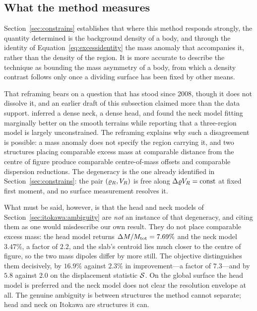 \subsection{What the method measures}
\label{sec:discussion:measures}

Section~\ref{sec:constrains} establishes that where this method responds
strongly, the quantity determined is the background density of a body, and
through the identity of Equation~\eqref{eq:excessidentity} the mass anomaly
that accompanies it, rather than the density of the region. It is more
accurate to describe the technique as bounding the mass asymmetry of a body,
from which a density contrast follows only once a dividing surface has been
fixed by other means.

That reframing bears on a question that has stood since 2008, though it does
not dissolve it, and an earlier draft of this subsection claimed more than
the data support. \citet{scheeres2008} inferred a dense neck,
\citet{lowry2014} a dense head, and \citet{kanamaru2019pss} found the neck
model fitting marginally better on the smooth terrains while reporting that
a three-region model is largely unconstrained. The reframing explains why
such a disagreement is possible: a mass anomaly does not specify the region
carrying it, and two structures placing comparable excess mass at comparable
distance from the centre of figure produce comparable centre-of-mass offsets
and comparable dispersion reductions. The degeneracy is the one already
identified in Section~\ref{sec:constrains}: the pair $(\varrho_{R},V_{R})$ is free
along $\Delta\varrho V_{R} = \mathrm{const}$ at fixed first moment, and no surface
measurement resolves it.

What must be said, however, is that the head and neck models of
Section~\ref{sec:itokawa:ambiguity} are \emph{not} an instance of that
degeneracy, and citing them as one would misdescribe our own result. They do
not place comparable excess mass: the head model returns
$\Delta M/M_{\mathrm{tot}} = 7.69\%$ and the neck model $3.47\%$, a factor of $2.2$, and
the slab's centroid lies much closer to the centre of figure, so the two
mass dipoles differ by more still. The objective distinguishes them
decisively, by $16.9\%$ against $2.3\%$ in improvement---a factor of
$7.3$---and by $5.8$ against $2.0$ on the displacement statistic
$\mathcal{S}$. On the global surface the head model is preferred and the neck
model does not clear the resolution envelope at all. The genuine ambiguity
is between structures the method cannot separate; head and neck on Itokawa
are structures it can.

